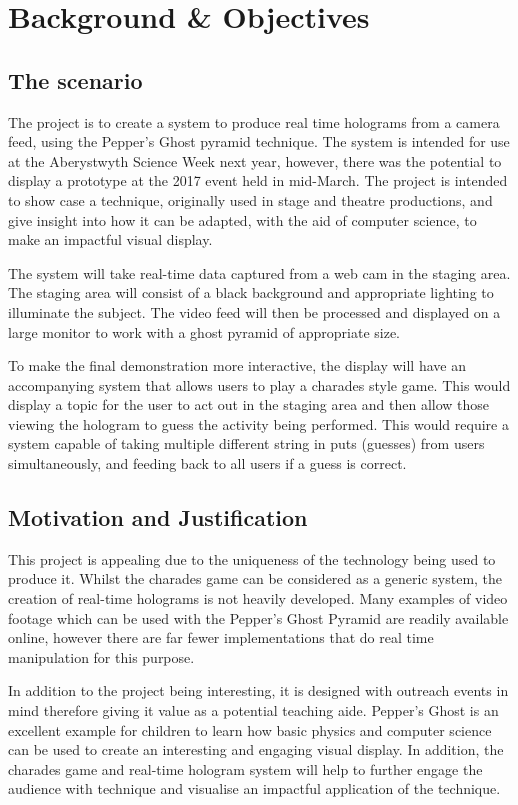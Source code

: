\chapter{Background \& Objectives}
\section{The scenario}
The project is to create a system to produce real time holograms from a camera feed, using the Pepper's Ghost pyramid technique. The system is intended for use at the Aberystwyth Science Week next year, however, there was the potential to display a prototype at the 2017 event held in mid-March. The project is intended to show case a technique, originally used in stage and theatre productions, and give insight into how it can be adapted, with the aid of computer science, to make an impactful visual display.

The system will take real-time data captured from a web cam in the  staging area. The staging area will consist of a black background and appropriate lighting to illuminate the subject. The video feed will then be processed and displayed on a large monitor to work with a ghost pyramid of appropriate size.

To make the final demonstration more interactive, the display will have an accompanying system that allows users to play a charades style game. This would display a topic for the user to act out in the staging area and then allow those viewing the hologram to guess the activity being performed. This would require a system capable of taking multiple different string in puts (guesses) from users simultaneously, and feeding back to all users if a guess is correct. 

\section{Motivation and Justification}
This project is appealing due to the uniqueness of the technology being used to produce it. Whilst the charades game can be considered as a generic system, the creation of real-time holograms is not heavily developed. Many examples of video footage which can be used with the Pepper's Ghost Pyramid are readily available online, however there are far fewer implementations that do real time manipulation for this purpose.

In addition to the project being interesting, it is designed with outreach events in mind therefore giving it value as a potential teaching aide. Pepper's Ghost is an excellent example for children to learn how basic physics and computer science can be used to create an interesting and engaging visual display. In addition, the charades game and real-time hologram system will help to further engage the audience with technique and visualise an impactful application of the technique. 

